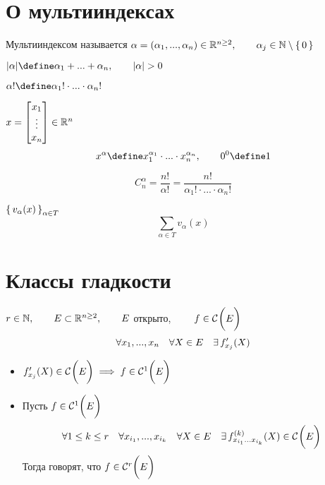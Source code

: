 \section{О мультииндексах}

\begin{definition}
	Мультииндексом называется $ \alpha = (\alpha_1, ..., \alpha_n) \in \R^{n \ge 2}, \qquad \alpha _j \in \N \setminus \set0 $
\end{definition}

\begin{definition}
	$ |\alpha| \define \alpha_1 + ... + \alpha_n, \qquad |\alpha| > 0 $
\end{definition}

\begin{notation}
	$ \alpha! \define \alpha_1! \cdot ... \cdot \alpha_n! $
\end{notation}

\begin{notation}
	$ x = \column{x_1}{x_n} \in \R^n $
	$$ x^\alpha \define x_1^{\alpha_1} \cdot ... \cdot x_n^{\alpha_n}, \qquad 0^0 \define 1 $$
\end{notation}

\begin{notation}
	$$ C_n^\alpha = \frac{n!}{\alpha!} = \frac{n!}{\alpha_1! \cdot ... \cdot \alpha_n!} $$
\end{notation}

\begin{notation}
	$ \set{v_\alpha(x)}_{\alpha \in T} $
	$$ \sum_{\alpha \in T} v_\alpha(x) $$
\end{notation}

\section{Классы гладкости}

\begin{definition}[$ \mathcal{C}^r(E) $]
	$ r \in \N, \qquad E \sub \R^{n \ge 2}, \qquad E $ открыто, $ \qquad f \in \Cont{E} $
	$$ \forall x_1, ..., x_n \quad \forall X \in E \quad \exist f_{x_j}'(X) $$
	\begin{itemize}
		\item $ f_{x_j}'(X) \in \Cont{E} \implies f \in \Cont[1]{E} $
		\item Пусть $ f \in \Cont[1]{E} $
		$$ \forall 1 \le k \le r \quad \forall x_{i_1}, ..., x_{i_k} \quad \forall X \in E \quad \exist f_{x_{i_1}...x_{i_k}}^{(k)}(X) \in \Cont{E} $$
		Тогда говорят, что $ f \in \Cont[r]{E} $
	\end{itemize}
\end{definition}

